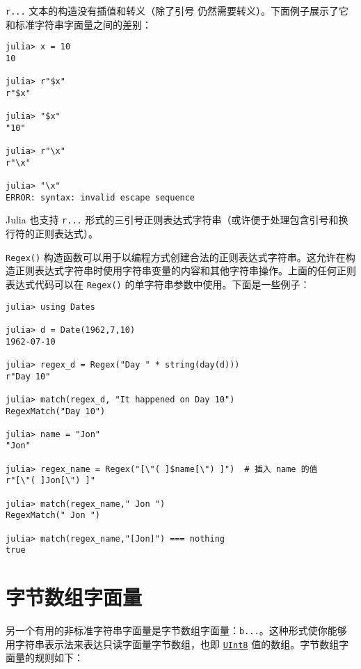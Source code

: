 \texttt{r{\textquotedbl}...{\textquotedbl}} 文本的构造没有插值和转义（除了引号 \texttt{{\textquotedbl}} 仍然需要转义）。下面例子展示了它和标准字符串字面量之间的差别：




\begin{verbatim}
julia> x = 10
10

julia> r"$x"
r"$x"

julia> "$x"
"10"

julia> r"\x"
r"\x"

julia> "\x"
ERROR: syntax: invalid escape sequence
\end{verbatim}



Julia 也支持 \texttt{r{\textquotedbl}{\textquotedbl}{\textquotedbl}...{\textquotedbl}{\textquotedbl}{\textquotedbl}} 形式的三引号正则表达式字符串（或许便于处理包含引号和换行符的正则表达式）。



\texttt{Regex()} 构造函数可以用于以编程方式创建合法的正则表达式字符串。这允许在构造正则表达式字符串时使用字符串变量的内容和其他字符串操作。上面的任何正则表达式代码可以在 \texttt{Regex()} 的单字符串参数中使用。下面是一些例子：




\begin{verbatim}
julia> using Dates

julia> d = Date(1962,7,10)
1962-07-10

julia> regex_d = Regex("Day " * string(day(d)))
r"Day 10"

julia> match(regex_d, "It happened on Day 10")
RegexMatch("Day 10")

julia> name = "Jon"
"Jon"

julia> regex_name = Regex("[\"( ]$name[\") ]")  # 插入 name 的值
r"[\"( ]Jon[\") ]"

julia> match(regex_name," Jon ")
RegexMatch(" Jon ")

julia> match(regex_name,"[Jon]") === nothing
true
\end{verbatim}



\hypertarget{6357751790368299582}{}


\section{字节数组字面量}



另一个有用的非标准字符串字面量是字节数组字面量：\texttt{b{\textquotedbl}...{\textquotedbl}}。这种形式使你能够用字符串表示法来表达只读字面量字节数组，也即 \hyperlink{6609065134969660118}{\texttt{UInt8}} 值的数组。字节数组字面量的规则如下：



